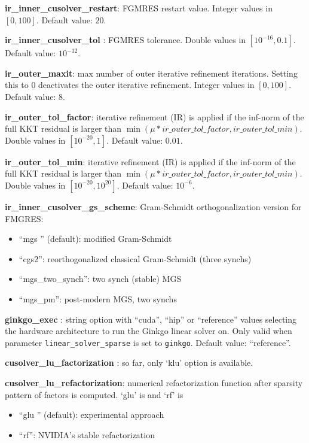 \noindent \textbf{ir\_inner\_cusolver\_restart}: FGMRES restart value. Integer values in $[0, 100]$. Default value: $20$.
\medskip

\noindent \textbf{ir\_inner\_cusolver\_tol }: FGMRES tolerance. Double values in $[10^{-16}, 0.1]$. Default value: $10^{-12}$.
\medskip

\noindent \textbf{ir\_outer\_maxit}: max number of outer iterative refinement iterations. Setting this to 0 deactivates the outer iterative refinement. Integer values in $[0, 100]$. Default value: $8$.
\medskip

\noindent \textbf{ir\_outer\_tol\_factor}: iterative refinement (IR) is applied if the inf-norm of the full KKT residual is larger than $\min (\mu*ir\_outer\_tol\_factor,ir\_outer\_tol\_min)$. Double values in $[10^{-20}, 1]$. Default value: $0.01$.
\medskip

\noindent \textbf{ir\_outer\_tol\_min}: iterative refinement (IR) is applied if the inf-norm of the full KKT residual is larger than $\min (\mu*ir\_outer\_tol\_factor,ir\_outer\_tol\_min)$. Double values in $[10^{-20}, 10^{20}]$. Default value: $10^{-6}$.
\medskip

\noindent \textbf{ir\_inner\_cusolver\_gs\_scheme}: Gram-Schmidt orthogonalization version for FMGRES:
\begin{itemize}
\item ``mgs '' (default): modified Gram-Schmidt
\item ``cgs2'': reorthogonalized classical Gram-Schmidt (three synchs)
\item ``mgs\_two\_synch'': two synch (stable) MGS
\item ``mgs\_pm'': post-modern MGS, two synchs
\end{itemize}
\medskip

\noindent \textbf{ginkgo\_exec }: string option with ``cuda'', ``hip'' or ``reference'' values selecting the hardware architecture to run the Ginkgo linear solver on. Only valid when parameter \texttt{linear\_solver\_sparse} is set to \texttt{ginkgo}. Default value: ``reference''.
\medskip

\noindent \textbf{cusolver\_lu\_factorization }: so far, only `klu' option is available.
\medskip

\noindent \textbf{cusolver\_lu\_refactorization}: numerical refactorization function after sparsity pattern of factors is computed. `glu' is  and `rf' is 
\begin{itemize}
\item ``glu '' (default): experimental approach
\item ``rf'': NVIDIA's stable refactorization
\end{itemize}
\medskip


